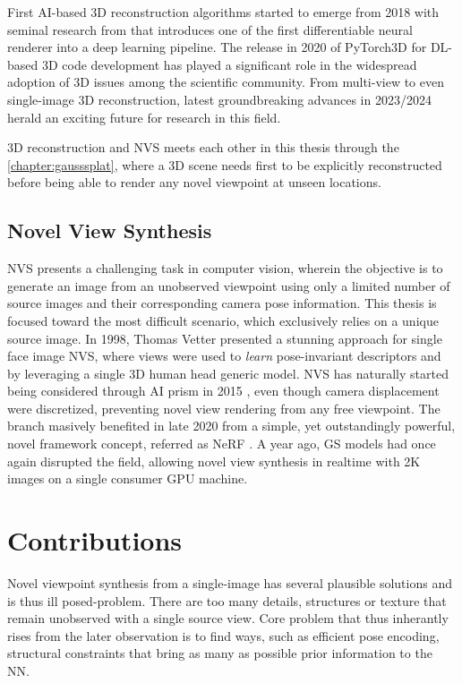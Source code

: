  First \ac{AI}-based 3D reconstruction algorithms started to emerge from 2018 with seminal research from \citep{kato2018neural} that introduces one of the first differentiable neural renderer into a deep learning pipeline.  The release in 2020 of PyTorch3D \citep{ravi2020pytorch3d} for \ac{DL}-based 3D code development has played a significant role in the widespread adoption of 3D issues among the scientific community. From multi-view \citep{li2023neuralangelo} to even single-image \citep{voleti2024sv3d} 3D reconstruction, latest groundbreaking advances in 2023/2024 herald an exciting future for research in this field. 

3D reconstruction and \ac{NVS} meets each other in this thesis through the \autoref{chapter:gausssplat}, where a 3D scene needs first to be explicitly reconstructed before being able to render any novel viewpoint at unseen locations. 

\subsection{Novel View Synthesis}
\ac{NVS} presents a challenging task in computer vision, wherein the objective is to generate an image from an unobserved viewpoint using only a limited number of source images and their corresponding camera pose information. This thesis is focused toward the most difficult scenario, which exclusively relies on a unique source image. In 1998, Thomas Vetter presented a stunning approach \cite{vetter1998synthesis} for single face image \ac{NVS}, where views were used to \textit{learn} pose-invariant descriptors and by leveraging a single 3D human head generic model. \ac{NVS} has naturally started being considered through \ac{AI} prism in 2015 \citep{yang2015weakly}, even though camera displacement were discretized, preventing novel view rendering from any free viewpoint. The branch masively benefited in late 2020 from a simple, yet outstandingly powerful, novel framework concept, referred as \ac{NeRF} \cite{mildenhall2020nerf}. A year ago, \ac{GS} models had once again disrupted the field, allowing novel view synthesis in realtime with 2K  images on a single consumer \ac{GPU} machine. 


\section{Contributions}
Novel viewpoint synthesis from a single-image has several plausible solutions and is thus ill posed-problem. There are too many details, structures or texture that remain unobserved with a single source view. Core problem that thus inherantly rises from the later observation is to find ways, such as efficient pose encoding, structural constraints that bring as many as possible prior information to the \ac{NN}. 


